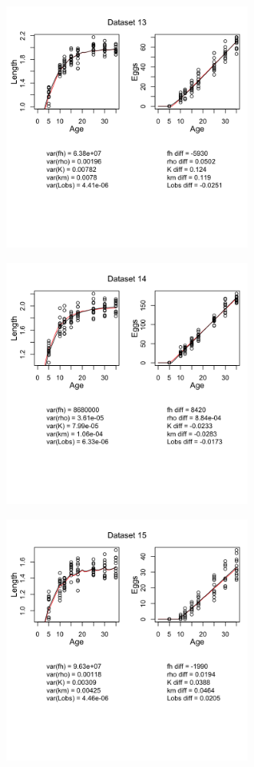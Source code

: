 \documentclass[12pt,reqno,final,pdftex]{amsart}\usepackage[]{graphicx}\usepackage[]{color}
\newenvironment{knitrout}{}{} %
\theoremstyle{plain}
\numberwithin{equation}{part}
\begin{document}
\begin{knitrout}
\includegraphics[width=0.6\textwidth]{figure/unnamed-chunk-5-13} \hfill{}




\includegraphics[width=0.6\textwidth]{figure/unnamed-chunk-5-14} \hfill{}




\includegraphics[width=0.6\textwidth]{figure/unnamed-chunk-5-15} \hfill{}





\end{knitrout}
\end{document}
